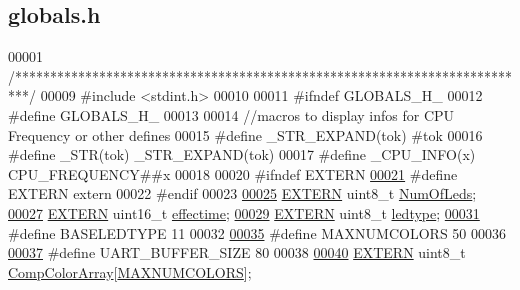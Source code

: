 \hypertarget{globals_8h_source}{}\subsection{globals.\+h}

\begin{DoxyCode}
00001 \textcolor{comment}{/**************************************************************************/}
00009 \textcolor{preprocessor}{#include <stdint.h>}
00010 
00011 \textcolor{preprocessor}{#ifndef GLOBALS\_H\_}
00012 \textcolor{preprocessor}{#define GLOBALS\_H\_}
00013 
00014 \textcolor{comment}{//macros to display infos for CPU Frequency or other defines}
00015 \textcolor{preprocessor}{#define \_STR\_EXPAND(tok) #tok}
00016 \textcolor{preprocessor}{#define \_STR(tok) \_STR\_EXPAND(tok)}
00017 \textcolor{preprocessor}{#define \_CPU\_INFO(x) CPU\_FREQUENCY##x}
00018 
00020 \textcolor{preprocessor}{#ifndef EXTERN}
\hypertarget{globals_8h_source_l00021}{}\hyperlink{globals_8h_a77366c1bd428629dc898e188bfd182a3}{00021} \textcolor{preprocessor}{#define EXTERN extern}
00022 \textcolor{preprocessor}{#endif}
00023 
\hypertarget{globals_8h_source_l00025}{}\hyperlink{globals_8h_ad5db4045aed262ed4aae2af9d81fab98}{00025} \hyperlink{globals_8h_a77366c1bd428629dc898e188bfd182a3}{EXTERN} uint8\_t \hyperlink{globals_8h_ad5db4045aed262ed4aae2af9d81fab98}{NumOfLeds};
\hypertarget{globals_8h_source_l00027}{}\hyperlink{globals_8h_ac2445d316b2972d381edeac44bb6a226}{00027} \hyperlink{globals_8h_a77366c1bd428629dc898e188bfd182a3}{EXTERN} uint16\_t \hyperlink{globals_8h_ac2445d316b2972d381edeac44bb6a226}{effectime};
\hypertarget{globals_8h_source_l00029}{}\hyperlink{globals_8h_a722e1eb38b661d1338ada3cc7a4049a0}{00029} \hyperlink{globals_8h_a77366c1bd428629dc898e188bfd182a3}{EXTERN} uint8\_t \hyperlink{globals_8h_a722e1eb38b661d1338ada3cc7a4049a0}{ledtype};
\hypertarget{globals_8h_source_l00031}{}\hyperlink{globals_8h_af07a5ce170c7be13d096843960e7b9da}{00031} \textcolor{preprocessor}{#define BASELEDTYPE 11}
00032 
\hypertarget{globals_8h_source_l00035}{}\hyperlink{globals_8h_a6e2b9e79df9491377ae405ef85aa0ca5}{00035} \textcolor{preprocessor}{#define MAXNUMCOLORS 50}
00036 
\hypertarget{globals_8h_source_l00037}{}\hyperlink{globals_8h_a0d57378e32bf8278011460740bc29f7f}{00037} \textcolor{preprocessor}{#define UART\_BUFFER\_SIZE 80}
00038 
\hypertarget{globals_8h_source_l00040}{}\hyperlink{globals_8h_a159854edb9d0c7283013495d85bdf997}{00040} \hyperlink{globals_8h_a77366c1bd428629dc898e188bfd182a3}{EXTERN} uint8\_t \hyperlink{globals_8h_a159854edb9d0c7283013495d85bdf997}{CompColorArray}[\hyperlink{globals_8h_a6e2b9e79df9491377ae405ef85aa0ca5}{MAXNUMCOLORS}];

\end{DoxyCode}
